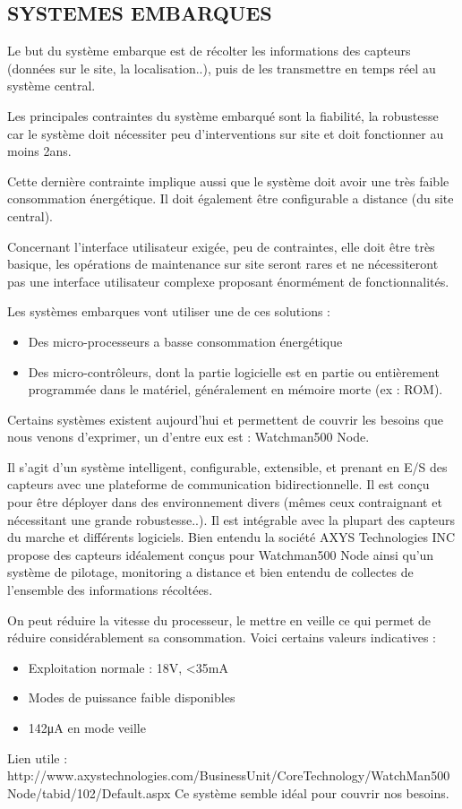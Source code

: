 \documentclass{article}
\begin{document}
\subsection{SYSTEMES EMBARQUES}

		Le but du système embarque est de récolter les informations des capteurs (données sur le site, la localisation..),
	puis de les transmettre en temps réel au système central.
		
		Les principales contraintes du système embarqué sont la fiabilité, la robustesse car le système doit nécessiter peu d'interventions sur site et doit fonctionner au moins 2ans. 
		
		Cette dernière contrainte implique aussi que le système doit avoir une très faible consommation énergétique. Il doit également être configurable a distance (du site central).
		
		Concernant l'interface utilisateur exigée, peu de contraintes, elle doit être très basique, les opérations de maintenance sur site seront rares et ne nécessiteront pas une interface utilisateur complexe proposant énormément de fonctionnalités.
		
		Les systèmes embarques vont utiliser une de ces solutions :
		\begin{itemize}
				\item Des micro-processeurs a basse consommation énergétique
				\item Des micro-contrôleurs, dont la partie logicielle est en partie ou entièrement programmée dans le matériel, généralement en mémoire morte (ex : ROM).
		\end{itemize}

		Certains systèmes existent aujourd'hui et permettent de couvrir les besoins que nous venons d'exprimer, un d'entre eux est : Watchman500 Node. 

{ Il s'agit d'un système intelligent, configurable, extensible, et prenant en E/S des capteurs avec une plateforme de communication bidirectionnelle.}
{Il est conçu pour être déployer dans des environnement divers (mêmes ceux contraignant et nécessitant une grande robustesse..). Il est intégrable avec la plupart des capteurs du marche et différents logiciels. Bien entendu la société AXYS Technologies INC propose des capteurs idéalement conçus pour Watchman500 Node ainsi qu'un système de pilotage, monitoring a distance et bien entendu de collectes de l'ensemble des informations récoltées.}
{On peut réduire la vitesse du processeur, le mettre en veille ce qui permet de réduire considérablement sa consommation. Voici certains valeurs indicatives : 
\begin{itemize}
       \item Exploitation normale : 18V, <35mA
       \item Modes de puissance faible disponibles
       \item 142μA en mode veille
\end{itemize}
}
{}
{Lien utile : http://www.axystechnologies.com/BusinessUnit/CoreTechnology/WatchMan500Node/tabid/102/Default.aspx}
{Ce système semble idéal pour couvrir nos besoins.}

		
\end{document}
